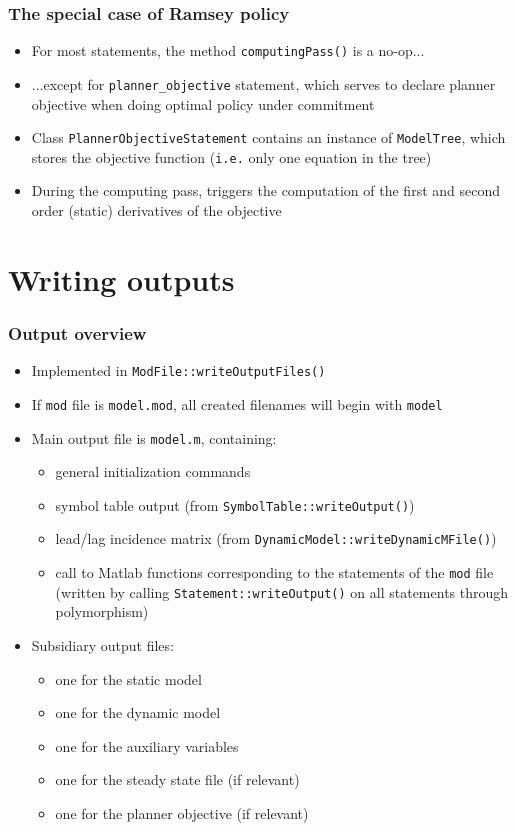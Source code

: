 \documentclass{beamer}
\begin{document}
\begin{frame}
  \frametitle{The special case of Ramsey policy}
  \begin{itemize}
  \item For most statements, the method \texttt{computingPass()} is a no-op...
  \item ...except for \texttt{planner\_objective} statement, which serves to declare planner objective when doing optimal policy under commitment
  \item Class \texttt{PlannerObjectiveStatement} contains an instance of \texttt{ModelTree}, which stores the objective function (\texttt{i.e.} only one equation in the tree)
  \item During the computing pass, triggers the computation of the first and second order (static) derivatives of the objective
  \end{itemize}
\end{frame}

\section{Writing outputs}

\begin{frame}
  \frametitle{Output overview}
  \begin{itemize}
  \item Implemented in \texttt{ModFile::writeOutputFiles()}
  \item If \texttt{mod} file is \texttt{model.mod}, all created filenames will begin with \texttt{model}
  \item Main output file is \texttt{model.m}, containing:
    \begin{itemize}
    \item general initialization commands
    \item symbol table output (from \texttt{SymbolTable::writeOutput()})
    \item lead/lag incidence matrix (from \texttt{DynamicModel::writeDynamicMFile()})
    \item call to Matlab functions corresponding to the statements of the \texttt{mod} file (written by calling \texttt{Statement::writeOutput()} on all statements through polymorphism)
    \end{itemize}
  \item Subsidiary output files:
    \begin{itemize}
    \item one for the static model
    \item one for the dynamic model
    \item one for the auxiliary variables
    \item one for the steady state file (if relevant)
    \item one for the planner objective (if relevant)
    \end{itemize}
  \end{itemize}
\end{frame}
\end{document}
